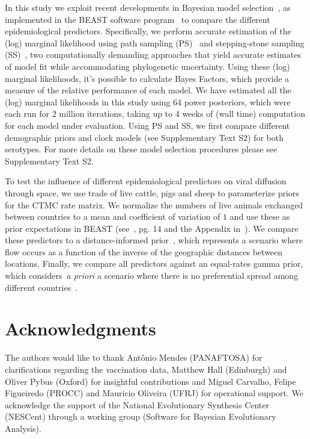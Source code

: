 \documentclass[10pt]{article}
\begin{document}
In this study we exploit recent developments in Bayesian model selection~\cite{Baele2012, Baele2013a, Baele2013b, Baele2013c}, as implemented in the BEAST software program~\cite{beast2012} to compare the different epidemiological predictors.
Specifically, we perform accurate estimation of the (log) marginal likelihood using path sampling (PS)~\cite{LartillotPhilippe} and stepping-stone sampling (SS)~\cite{Xie}, two computationally demanding approaches that yield accurate estimates of model fit while accommodating phylogenetic uncertainty.
Using these (log) marginal likelihoods, it's possible to calculate Bayes Factors, which provide a measure of the relative performance of each model. 
We have estimated all the (log) marginal likelihoods in this study using 64 power posteriors, which were each run for 2 million iterations, taking up to 4 weeks of (wall time) computation for each model under evaluation. 
Using PS and SS, we first compare different demographic priors and clock models (see Supplementary Text S2) for both serotypes. 
For more details on these model selection procedures please see Supplementary Text S2.

To test the influence of different epidemiological predictors on viral diffusion through space, we use trade of live cattle, pigs and sheep to parameterize priors for the CTMC rate matrix.
We normalize the numbers of live animals exchanged between countries to a mean and coefficient of variation of $1$ and use these as prior expectations in BEAST (see~\cite{roots}, pg. 14 and the Appendix in~\cite{Carvalho2013}).  
We compare these predictors to a distance-informed prior~\cite{roots}, which represents a scenario where flow occurs as a function of the inverse of the geographic distances between locations.
Finally, we compare all predictors against an equal-rates gamma prior, which considers~\textit{a priori} a scenario where there is no preferential spread among different countries~\cite{Nelson2011}.

\section*{Acknowledgments}
The authors would like to thank Ant\^onio Mendes (PANAFTOSA) for clarifications regarding the vaccination data, Matthew Hall (Edinburgh) and Oliver Pybus (Oxford) for insightful contributions and Miguel Carvalho, Felipe Figueiredo (PROCC) and Mauricio Oliveira (UFRJ) for operational support.
We acknowledge the support of the National Evolutionary Synthesis Center (NESCent) through a working group (Software for Bayesian Evolutionary Analysis).
\end{document}
